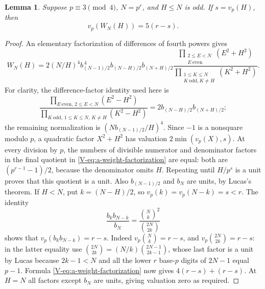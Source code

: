 \documentclass[11pt,letterpaper]{article}
\newtheorem{lemma}[theorem]{Lemma}
\numberwithin{equation}{section}
\begin{document}
\begin{lemma}\label{V-lem:a-weight-valuation}
Suppose $p\equiv3\pmod4$, $N=p^r$, and $H\le N$ is odd. If
$s=v_p(H)$, then
\[
 v_p(W_N(H))=5(r-s).
\]
\end{lemma}
\begin{proof}
An elementary factorization of differences of fourth powers gives
\begin{equation}\label{V-eq:a-weight-factorization}
 W_N(H)=2(N/H)^4b_{(N-1)/2}^{\,4}
 b_{(N-H)/2}b_{(N+H)/2}
 \frac{\prod_{\substack{2\le E<N\\E\ \mathrm{even}}}(E^2+H^2)}
 {\prod_{\substack{1\le K\le N\\K\ \mathrm{odd},K\ne H}}(K^2+H^2)}.
\end{equation}
For clarity, the difference-factor identity used here is
\[
 \frac{\prod_{E\ \mathrm{even},\,2\le E<N}(E^2-H^2)}
 {\prod_{K\ \mathrm{odd},\,1\le K\le N,\,K\ne H}(K^2-H^2)}
 =2b_{(N-H)/2}b_{(N+H)/2};
\]
the remaining normalization is $(Nb_{(N-1)/2}/H)^4$.
Since $-1$ is a nonsquare modulo $p$, a quadratic factor $X^2+H^2$
has valuation $2\min(v_p(X),s)$. At every division by $p$, the numbers
of divisible numerator and denominator factors in the final quotient
in \eqref{V-eq:a-weight-factorization} are equal: both are
$(p^{r-1}-1)/2$, because the denominator omits $H$. Repeating until
$H/p^s$ is a unit proves that this quotient is a unit.
Also $b_{(N-1)/2}$ and $b_N$ are units, by Lucas's theorem. If $H<N$,
put $k=(N-H)/2$, so $v_p(k)=v_p(N-k)=s<r$. The identity
\[
 \frac{b_kb_{N-k}}{b_N}
 =\frac{\binom Nk^2}{\binom{2N}{2k}}
\]
shows that $v_p(b_kb_{N-k})=r-s$. Indeed
$v_p\binom Nk=r-s$, and
$v_p\binom{2N}{2k}=r-s$: in the latter equality use
$\binom{2N}{2k}=(N/k)\binom{2N-1}{2k-1}$, whose last factor is a unit
by Lucas because $2k-1<N$ and all the lower $r$ base-$p$ digits of
$2N-1$ equal $p-1$. Formula \eqref{V-eq:a-weight-factorization} now gives
$4(r-s)+(r-s)$. At $H=N$ all factors except $b_N$ are units, giving
valuation zero as required.
\end{proof}
\end{document}
